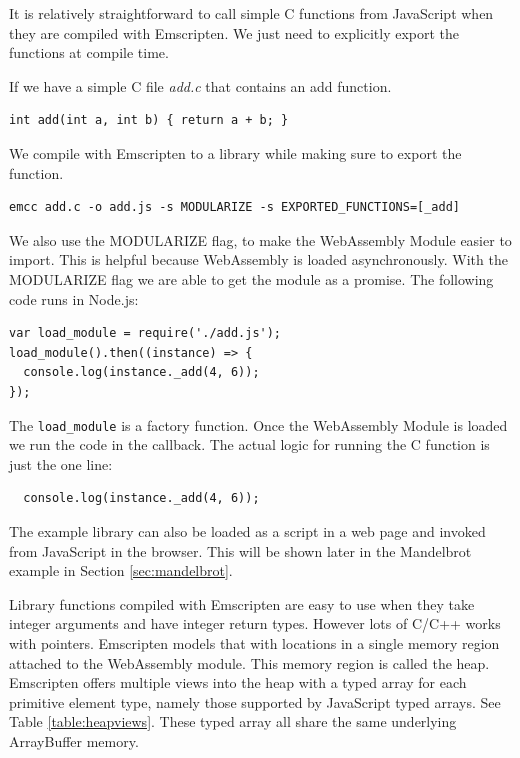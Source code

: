 \documentclass[11pt]{book}
\begin{document}
It is relatively straightforward to call simple C functions from JavaScript when they are compiled with Emscripten. We just need to explicitly export the functions at compile time.

If we have a simple C file \textit{add.c} that contains an add function.
\begin{verbatim}
int add(int a, int b) { return a + b; }
\end{verbatim}
We compile with Emscripten to a library while making sure to export the function.
\begin{verbatim}
emcc add.c -o add.js -s MODULARIZE -s EXPORTED_FUNCTIONS=[_add]
\end{verbatim}
We also use the MODULARIZE flag, to make the WebAssembly Module easier to import. This is helpful because WebAssembly is loaded asynchronously. With the MODULARIZE flag we are able to get the module as a promise. The following code runs in Node.js:
\begin{verbatim}
var load_module = require('./add.js');
load_module().then((instance) => {
  console.log(instance._add(4, 6));
});
\end{verbatim}
The \texttt{load\_module} is a factory function. Once the WebAssembly Module is loaded we run the code in the callback. The actual logic for running the C function is just the one line:
\begin{verbatim}
  console.log(instance._add(4, 6));
\end{verbatim}
The example library can also be loaded as a script in a web page and invoked from JavaScript in the browser. This will be shown later in the Mandelbrot example in Section \ref{sec:mandelbrot}.

Library functions compiled with Emscripten are easy to use when they take integer arguments and have integer return types. However lots of C/C++ works with pointers. Emscripten models that with locations in a single memory region attached to the WebAssembly module. This memory region is called the heap. Emscripten offers multiple views into the heap with a typed array for each primitive element type, namely those supported by JavaScript typed arrays. See Table \ref{table:heapviews}. These typed array all share the same underlying ArrayBuffer memory.

\end{document}
